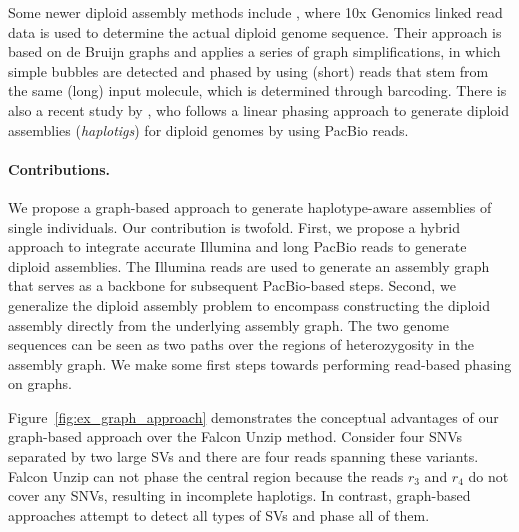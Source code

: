 Some newer diploid assembly methods include \cite{weisenfeld2017direct}, where 10x Genomics linked read data is used to determine the actual diploid genome sequence. 
Their approach is based on de Bruijn graphs and applies a series of graph simplifications, in which simple bubbles are detected and phased by using (short) reads that stem from the same (long) input molecule, which is determined through barcoding.
There is also a recent study by \cite{chin2016phased}, who follows a linear phasing approach to generate diploid assemblies (\textit{haplotigs}) for diploid genomes by using PacBio reads.

\paragraph{Contributions.}
We propose a graph-based approach to generate haplotype-aware assemblies of single individuals.
Our contribution is twofold. First, we propose a hybrid approach to integrate accurate Illumina and long PacBio reads to generate diploid assemblies. 
The Illumina reads are used to generate an assembly graph that serves as a backbone for subsequent PacBio-based steps.
Second, we generalize the diploid assembly problem to encompass constructing the diploid assembly directly from the underlying assembly graph.
The two genome sequences can be seen as two paths over the regions of heterozygosity in the assembly graph.
We make some first steps towards performing read-based phasing on graphs.

Figure~\ref{fig:ex_graph_approach} demonstrates the conceptual advantages of our graph-based approach over the Falcon Unzip method.
Consider four SNVs separated by two large SVs and there are four reads spanning these variants.
Falcon Unzip can not phase the central region because the reads $r_3$ and $r_4$ do not cover any SNVs, resulting in incomplete haplotigs.
In contrast, graph-based approaches attempt to detect all types of SVs and phase all of them.

